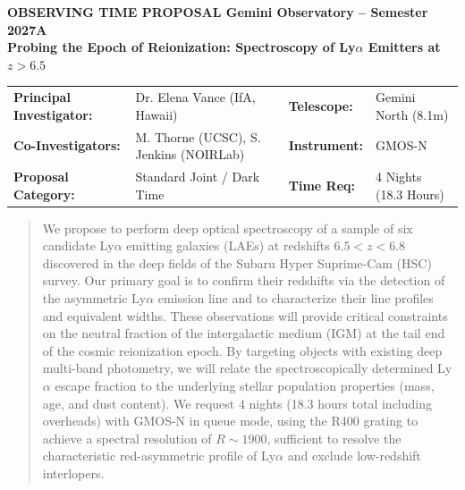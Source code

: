 \documentclass[11pt]{article}
\begin{document}
\begin{tcolorbox}[
    enhanced,
    colback=lightgray,
    colframe=brandblue,
    boxrule=0.8pt,
    arc=4pt,
    left=12pt, right=12pt, top=12pt, bottom=12pt
]
    {\small\bfseries\color{accentblue} OBSERVING TIME PROPOSAL \hfill Gemini Observatory -- Semester 2027A}\\[0.2cm]
    {\Large\bfseries\color{brandblue} Probing the Epoch of Reionization: Spectroscopy of Ly$\alpha$ Emitters at $z > 6.5$}\\[0.4cm]
    \renewcommand{\arraystretch}{1.2}
    \begin{tabularx}{\textwidth}{@{}l Y l Y@{}}
        \textbf{Principal Investigator:} & Dr. Elena Vance (IfA, Hawaii) & \textbf{Telescope:} & Gemini North (8.1m) \\
        \textbf{Co-Investigators:} & M. Thorne (UCSC), S. Jenkins (NOIRLab) & \textbf{Instrument:} & GMOS-N \\
        \textbf{Proposal Category:} & Standard Joint / Dark Time & \textbf{Time Req:} & 4 Nights (18.3 Hours)
    \end{tabularx}
\end{tcolorbox}

\begin{abstract}
\noindent
We propose to perform deep optical spectroscopy of a sample of six candidate Ly$\alpha$ emitting galaxies (LAEs) at redshifts $6.5 < z < 6.8$ discovered in the deep fields of the Subaru Hyper Suprime-Cam (HSC) survey. Our primary goal is to confirm their redshifts via the detection of the asymmetric Ly$\alpha$ emission line and to characterize their line profiles and equivalent widths. These observations will provide critical constraints on the neutral fraction of the intergalactic medium (IGM) at the tail end of the cosmic reionization epoch. By targeting objects with existing deep multi-band photometry, we will relate the spectroscopically determined Ly$\alpha$ escape fraction to the underlying stellar population properties (mass, age, and dust content). We request 4 nights (18.3 hours total including overheads) with GMOS-N in queue mode, using the R400 grating to achieve a spectral resolution of $R \sim 1900$, sufficient to resolve the characteristic red-asymmetric profile of Ly$\alpha$ and exclude low-redshift interlopers.
\end{abstract}




\end{document}
